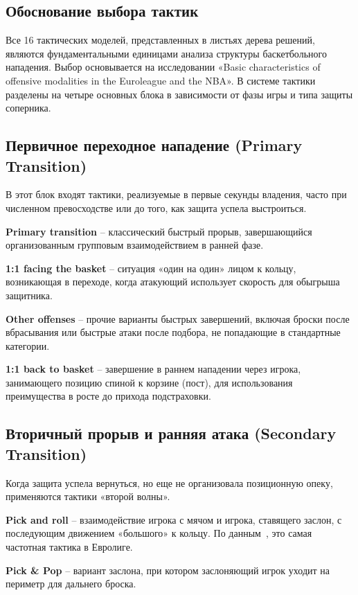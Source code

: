 \documentclass[a4paper, final]{article}
\begin{document}
\subsection{Обоснование выбора тактик}

Все 16 тактических моделей, представленных в листьях дерева решений, являются фундаментальными единицами анализа структуры баскетбольного нападения. Выбор основывается на исследовании «Basic characteristics of offensive modalities in the Euroleague and the NBA». \cite{selmanović} В системе тактики разделены на четыре основных блока в зависимости от фазы игры и типа защиты соперника.

\subsection{Первичное переходное нападение (Primary Transition)}

В этот блок входят тактики, реализуемые в первые секунды владения, часто при численном превосходстве или до того, как защита успела выстроиться.

\textbf{Primary transition} -- классический быстрый прорыв, завершающийся организованным групповым взаимодействием в ранней фазе.

\textbf{1:1 facing the basket} -- ситуация «один на один» лицом к кольцу, возникающая в переходе, когда атакующий использует скорость для обыгрыша защитника.

\textbf{Other offenses} -- прочие варианты быстрых завершений, включая броски после вбрасывания или быстрые атаки после подбора, не попадающие в стандартные категории.

\textbf{1:1 back to basket} -- завершение в раннем нападении через игрока, занимающего позицию спиной к корзине (пост), для использования преимущества в росте до прихода подстраховки.

\subsection{Вторичный прорыв и ранняя атака (Secondary Transition)}

Когда защита успела вернуться, но еще не организовала позиционную опеку, применяются тактики «второй волны».

\textbf{Pick and roll } -- взаимодействие игрока с мячом и игрока, ставящего заслон, с последующим движением «большого» к кольцу. По данным~\cite{selmanović}, это самая частотная тактика в Евролиге.

\textbf{Pick \& Pop} -- вариант заслона, при котором заслоняющий игрок уходит на периметр для дальнего броска.
\end{document}
